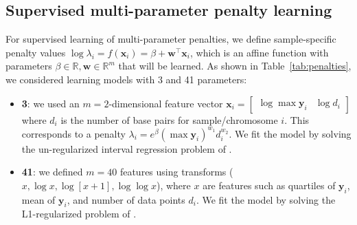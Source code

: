 \documentclass{article}
\newcommand{\RR}{\mathbb R}
\begin{document}
\subsection{Supervised multi-parameter penalty learning}
\label{sec:supervised-multi}

For supervised learning of multi-parameter penalties, we
define sample-specific penalty values $\log \lambda_i = f(\mathbf
x_i)= \beta + \mathbf w^\intercal \mathbf x_i$, which is an affine
function with parameters $\beta\in\RR,\mathbf w\in\RR^m$ that will be
learned. As shown in Table~\ref{tab:penalties}, we considered learning
models with 3 and 41 parameters:

\begin{itemize}
\item \textbf{3}: we used an $m=2$-dimensional feature
  vector $\mathbf x_i = \left[\begin{array}{cc} \log\max \mathbf y_i &
      \log d_i
\end{array}\right]$ where $d_i$ is the number of base pairs for 
sample/chromosome $i$.  This corresponds to a penalty $\lambda_i =
e^\beta (\max\mathbf y_i)^{w_1} d_i^{w_2}$. We fit the model by
solving the un-regularized interval regression problem of
\citet{HOCKING-penalties}.
\item \textbf{41}: we defined $m=40$ features using transforms ($x,
  \log x, \log[x+1], \log\log x$), where $x$ are features such as
  quartiles of $\mathbf y_i$, mean of $\mathbf y_i$, and
  number of data points $d_i$. We fit the model by solving
  the L1-regularized problem of
  \citet{HOCKING-penalties}.
\end{itemize}
\end{document}
